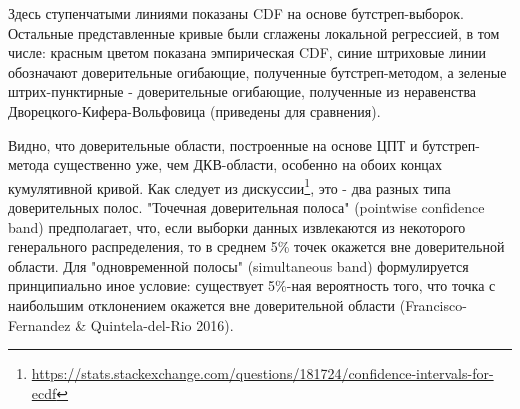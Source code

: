 \documentclass[14pt,a4paper]{scrartcl}
\begin{document}
Здесь ступенчатыми линиями показаны CDF на основе бутстреп-выборок. Остальные представленные кривые были сглажены локальной регрессией, в том числе: красным цветом показана эмпирическая CDF, синие штриховые линии обозначают доверительные огибающие, полученные бутстреп-методом, а зеленые штрих-пунктирные - доверительные огибающие, полученные из неравенства Дворецкого-Кифера-Вольфовица (приведены для сравнения).


Видно, что доверительные области, построенные на основе ЦПТ и бутстреп-метода существенно уже, чем ДКВ-области, особенно на обоих концах кумулятивной кривой. Как следует из дискуссии\footnote{\url{https://stats.stackexchange.com/questions/181724/confidence-intervals-for-ecdf}}, это - два разных типа доверительных полос. "Точечная доверительная полоса" (pointwise confidence band) предполагает, что, если выборки данных извлекаются из некоторого генерального распределения, то в среднем 5\% точек окажется вне доверительной области. Для "одновременной полосы" (simultaneous band) формулируется принципиально иное условие: существует 5\%-ная вероятность того, что точка с наибольшим отклонением окажется вне доверительной области (Francisco-Fernandez \& Quintela-del-Rio 2016).
\end{document}
